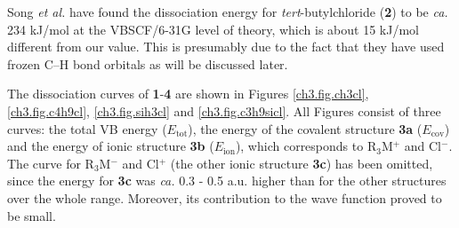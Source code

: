 Song \textit{et al.} \cite{song} have found the dissociation energy for \textit{tert}-butylchloride (\textbf{2}) to be \textit{ca.} 234 kJ/mol at the VBSCF/6-31G level of theory, which is about 15 kJ/mol different from our value. This is presumably due to the fact that they have used frozen C--H bond orbitals as will be discussed later.

The dissociation curves of \textbf{1}-\textbf{4} are shown in Figures \ref{ch3.fig.ch3cl}, \ref{ch3.fig.c4h9cl}, \ref{ch3.fig.sih3cl} and \ref{ch3.fig.c3h9sicl}. All Figures consist of three curves: the total VB energy ($E_\mathrm{tot}$), the energy of the covalent structure \textbf{3a} ($E_\mathrm{cov}$) and the energy of ionic structure \textbf{3b} ($E_\mathrm{ion}$), which corresponds to R$_3$M$^{+}$ and Cl$^{-}$. The curve for R$_3$M$^{-}$ and Cl$^{+}$ (the other ionic structure \textbf{3c}) has been omitted, since the energy for \textbf{3c} was \textit{ca.} 0.3 - 0.5 a.u. higher than for the other structures over the whole range. Moreover, its contribution to the wave function proved to be small.  

